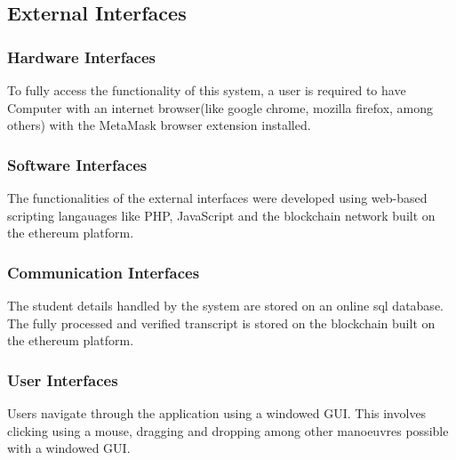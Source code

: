 \subsection{External Interfaces}

\subsubsection{Hardware Interfaces}
To fully access the functionality of this system, a user is required to have Computer with an internet browser(like google chrome, mozilla firefox, among others) with the MetaMask browser extension installed. 

\subsubsection{Software Interfaces}
The functionalities of the external interfaces were developed using web-based scripting langauages like PHP, JavaScript and the blockchain network built on the ethereum platform.

\subsubsection{Communication Interfaces}
The student details handled by the system are stored on an online sql database. The fully processed and verified transcript is stored on the blockchain built on the ethereum platform.

\subsubsection{User Interfaces}
Users navigate through the application using a windowed GUI. This involves clicking using a mouse, dragging and dropping among other manoeuvres possible with a windowed GUI.